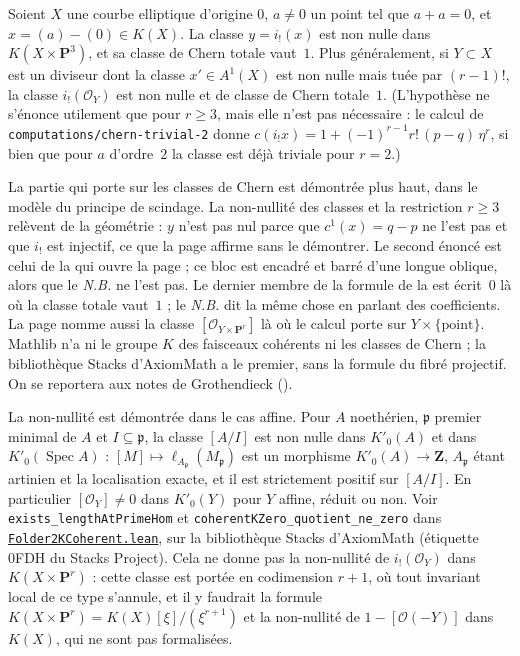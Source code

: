 \begin{encadre}
\begin{theoreme*}\nonverifie
Soient $X$ une courbe elliptique d'origine $0$, $a \neq 0$ un point tel que $a + a = 0$, et $x = (a) - (0) \in K(X)$. La classe $y = i_!(x)$ est non nulle dans $K(X \times \mathbf P^3)$, et sa classe de Chern totale vaut~$1$. Plus généralement, si $Y \subset X$ est un diviseur dont la classe $x' \in A^1(X)$ est non nulle mais tuée par $(r-1)!$, la classe $i_!(\mathcal O_Y)$ est non nulle et de classe de Chern totale~$1$. (L'hypothèse  ne s'énonce utilement que pour $r \geq 3$, mais elle n'est pas nécessaire : le calcul de \nolinkurl{computations/chern-trivial-2} donne $c(i_!x) = 1 + (-1)^{r-1} r!\,(p-q)\,\eta^r$, si bien que pour $a$ d'ordre~$2$ la classe est déjà triviale pour $r = 2$.)
\end{theoreme*}
\end{encadre}
{\small La partie qui porte sur les classes de Chern est démontrée plus haut, dans le modèle du principe de scindage. La non-nullité des classes et la restriction $r \geq 3$ relèvent de la géométrie : $y$ n'est pas nul parce que $c^1(x) = q - p$ ne l'est pas et que $i_!$ est injectif, ce que la page affirme sans le démontrer. Le second énoncé est celui de la  qui ouvre la page ; ce bloc est encadré et barré d'une longue oblique, alors que le \emph{N.B.} ne l'est pas. Le dernier membre de la formule de la  est écrit~$0$ là où la classe totale vaut~$1$ ; le \emph{N.B.} dit la même chose en parlant des coefficients. La page nomme aussi la classe $[\mathcal O_{Y \times \mathbf P^r}]$ là où le calcul porte sur $Y \times \{\text{point}\}$. Mathlib n'a ni le groupe $K$ des faisceaux cohérents ni les classes de Chern ; la bibliothèque Stacks d'AxiomMath a le premier, sans la formule du fibré projectif. On se reportera aux notes de Grothendieck ().\par}
{\small La non-nullité est démontrée dans le cas affine. Pour $A$ noethérien, $\mathfrak p$ premier minimal de $A$ et $I \subseteq \mathfrak p$, la classe $[A/I]$ est non nulle dans $K'_0(A)$ et dans $K'_0(\operatorname{Spec} A)$ : $[M] \mapsto \ell_{A_{\mathfrak p}}(M_{\mathfrak p})$ est un morphisme $K'_0(A) \to \mathbf Z$, $A_{\mathfrak p}$ étant artinien et la localisation exacte, et il est strictement positif sur $[A/I]$. En particulier $[\mathcal O_Y] \neq 0$ dans $K'_0(Y)$ pour $Y$ affine, réduit ou non. Voir \texttt{exists\_lengthAtPrimeHom} et \texttt{coherentKZero\_quotient\_ne\_zero} dans \href{\leanblobmain/AlgebraicGeometry/Folder2KCoherent.lean}{\texttt{Folder2KCoherent.\allowbreak{}lean}}, sur la bibliothèque Stacks d'AxiomMath \cite{axiomstacks} (étiquette 0FDH du Stacks Project). Cela ne donne pas la non-nullité de $i_!(\mathcal O_Y)$ dans $K(X \times \mathbf P^r)$ : cette classe est portée en codimension $r + 1$, où tout invariant local de ce type s'annule, et il y faudrait la formule $K(X \times \mathbf P^r) = K(X)[\xi]/(\xi^{r+1})$ et la non-nullité de $1 - [\mathcal O(-Y)]$ dans $K(X)$, qui ne sont pas formalisées.\par}

